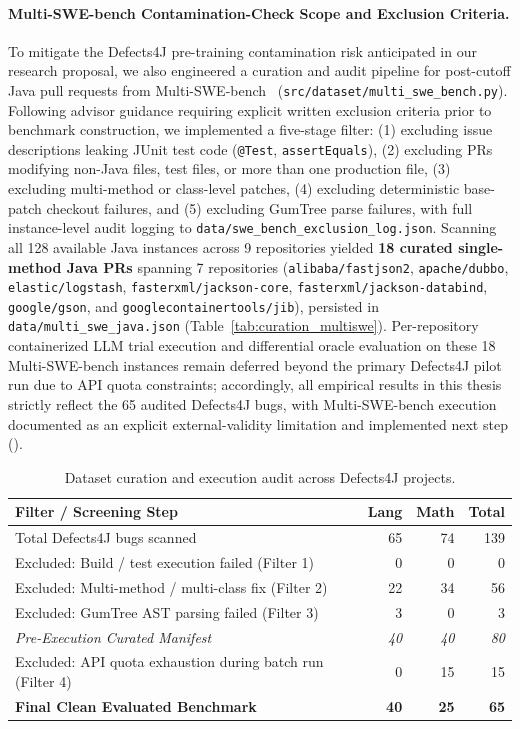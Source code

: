 \documentclass[12pt, a4paper]{article}
\begin{document}
\paragraph{Multi-SWE-bench Contamination-Check Scope and Exclusion Criteria.}
To mitigate the Defects4J pre-training contamination risk anticipated in our research proposal, we also engineered a curation and audit pipeline for post-cutoff Java pull requests from Multi-SWE-bench~\citep{multiswebench2025} (\texttt{src/dataset/multi\_swe\_bench.py}).
Following advisor guidance requiring explicit written exclusion criteria prior to benchmark construction, we implemented a five-stage filter: (1) excluding issue descriptions leaking JUnit test code (\texttt{@Test}, \texttt{assertEquals}), (2) excluding PRs modifying non-Java files, test files, or more than one production file, (3) excluding multi-method or class-level patches, (4) excluding deterministic base-patch checkout failures, and (5) excluding GumTree parse failures, with full instance-level audit logging to \texttt{data/swe\_bench\_exclusion\_log.json}.
Scanning all 128 available Java instances across 9 repositories yielded \textbf{18 curated single-method Java PRs} spanning 7 repositories (\texttt{alibaba/fastjson2}, \texttt{apache/dubbo}, \texttt{elastic/logstash}, \texttt{fasterxml/jackson-core}, \texttt{fasterxml/jackson-databind}, \texttt{google/gson}, and \texttt{googlecontainertools/jib}), persisted in \texttt{data/multi\_swe\_java.json} (Table~\ref{tab:curation_multiswe}).
Per-repository containerized LLM trial execution and differential oracle evaluation on these 18 Multi-SWE-bench instances remain deferred beyond the primary Defects4J pilot run due to API quota constraints; accordingly, all empirical results in this thesis strictly reflect the 65 audited Defects4J bugs, with Multi-SWE-bench execution documented as an explicit external-validity limitation and implemented next step ().



\begin{table}[t]
\centering
\caption{Dataset curation and execution audit across Defects4J projects.}
\label{tab:curation}
\begin{tabular}{lrrr}
\toprule
Filter / Screening Step & Lang & Math & Total \\
\midrule
Total Defects4J bugs scanned & 65 & 74 & 139 \\
Excluded: Build / test execution failed (Filter 1) & 0 & 0 & 0 \\
Excluded: Multi-method / multi-class fix (Filter 2) & 22 & 34 & 56 \\
Excluded: GumTree AST parsing failed (Filter 3) & 3 & 0 & 3 \\
\midrule
\emph{Pre-Execution Curated Manifest} & \emph{40} & \emph{40} & \emph{80} \\
Excluded: API quota exhaustion during batch run (Filter 4) & 0 & 15 & 15 \\
\midrule
\textbf{Final Clean Evaluated Benchmark} & \textbf{40} & \textbf{25} & \textbf{65} \\
\bottomrule
\end{tabular}
\end{table}
\end{document}
